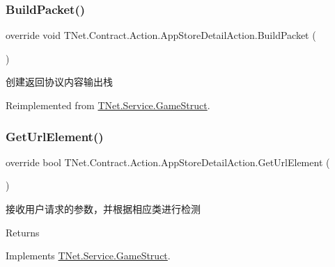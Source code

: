 \subsubsection{\texorpdfstring{Build\+Packet()}{BuildPacket()}}
{\footnotesize\ttfamily override void T\+Net.\+Contract.\+Action.\+App\+Store\+Detail\+Action.\+Build\+Packet (\begin{DoxyParamCaption}{ }\end{DoxyParamCaption})\hspace{0.3cm}{\ttfamily [virtual]}}



创建返回协议内容输出栈 



Reimplemented from \mbox{\hyperlink{class_t_net_1_1_service_1_1_game_struct_a07c2501acfc1957399e45b1c3539bc70}{T\+Net.\+Service.\+Game\+Struct}}.

\mbox{\label{class_t_net_1_1_contract_1_1_action_1_1_app_store_detail_action_ab8bc090e0a3f36cf0e90a693e12d183a}} 
\subsubsection{\texorpdfstring{Get\+Url\+Element()}{GetUrlElement()}}
{\footnotesize\ttfamily override bool T\+Net.\+Contract.\+Action.\+App\+Store\+Detail\+Action.\+Get\+Url\+Element (\begin{DoxyParamCaption}{ }\end{DoxyParamCaption})\hspace{0.3cm}{\ttfamily [virtual]}}



接收用户请求的参数，并根据相应类进行检测 

\begin{DoxyReturn}{Returns}

\end{DoxyReturn}


Implements \mbox{\hyperlink{class_t_net_1_1_service_1_1_game_struct_ad4167cb7ce62183a1336ebc30a848bfc}{T\+Net.\+Service.\+Game\+Struct}}.

